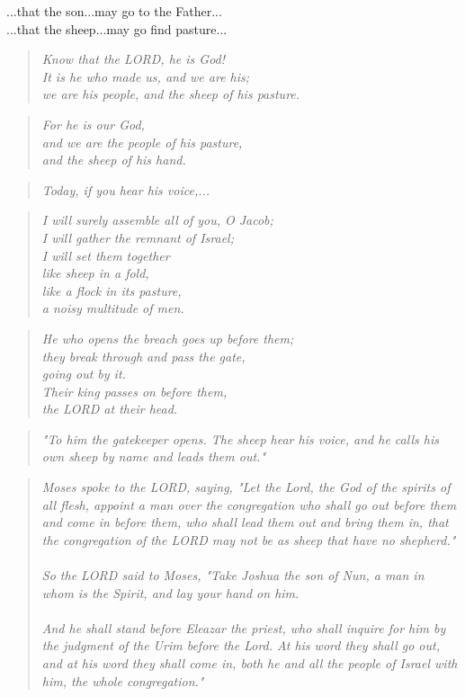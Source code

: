 \documentclass[10pt,oneside,footinclude=true,headinclude=true]{scrbook} %
\newcommand\quot[1]{
	\begin{quote}\textit{\small#1}\end{quote}
}
\begin{document}
\noindent...that the son...may go to the Father...\\
...that the sheep...may go find pasture...

\quot{Know that the LORD, he is God!\\
\hspace*{5mm}It is he who made us, and we are his;\\
\hspace*{5mm}we are his people, and the sheep of his pasture.}

\quot{For he is our God,\\
\hspace*{5mm}and we are the people of his pasture,\\
\hspace*{5mm}and the sheep of his hand.}

\quot{Today, if you hear his voice,...}

\quot{I will surely assemble all of you, O Jacob;\\
\hspace*{5mm}I will gather the remnant of Israel;\\
I will set them together\\
\hspace*{5mm}like sheep in a fold,\\
like a flock in its pasture,\\
\hspace*{5mm}a noisy multitude of men.}

\quot{He who opens the breach goes up before them;\\
\hspace*{5mm}they break through and pass the gate,\\
\hspace*{5mm}going out by it.\\
Their king passes on before them,\\
\hspace*{5mm}the LORD at their head.}

\quot{"To him the gatekeeper opens. The sheep hear his voice, and he calls his own sheep by name and leads them out."}

\quot{Moses spoke to the LORD, saying, "Let the Lord, the God of the spirits of all flesh, appoint a man over the congregation who shall go out before them and come in before them, who shall lead them out and bring them in, that the congregation of the LORD may not be as sheep that have no shepherd."\\
\\
So the LORD said to Moses, "Take Joshua the son of Nun, a man in whom is the Spirit, and lay your hand on him.\\
\\
And he shall stand before Eleazar the priest, who shall inquire for him by the judgment of the Urim before the Lord. At his word they shall go out, and at his word they shall come in, both he and all the people of Israel with him, the whole congregation."}
\end{document}
